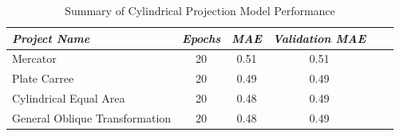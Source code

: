 \begin{table}[ht]
    \centering
    \caption{Summary of Cylindrical Projection Model Performance}
    \label{cylindrical_results_table}
    \renewcommand{\arraystretch}{1.2} %
    \begin{tabular}{|l|c|c|c|c|c|}
        \hline
        \rowcolor[gray]{0.9}
        \textbf{\emph{Project Name}}   & \textbf{\emph{Epochs}} & \textbf{\emph{MAE}} & \textbf{\emph{Validation MAE}} \\ \hline
        Mercator                       & 20                     & 0.51                & 0.51                           \\ \hline
        Plate Carree                   & 20                     & 0.49                & 0.49                           \\ \hline
        Cylindrical Equal Area         & 20                     & 0.48                & 0.49                           \\ \hline
        General Oblique Transformation & 20                     & 0.48                & 0.49                           \\ \hline
    \end{tabular}


\end{table}